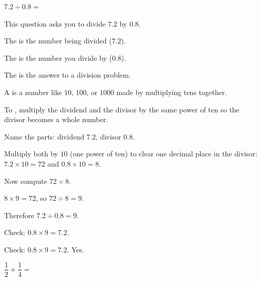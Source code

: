 
\noindent $7.2 \div 0.8 = $\ansblank{}


\noindent This question asks you to divide $7.2$ by $0.8$.

\begin{words}
  \item The is the number being divided ($7.2$).
  \item The is the number you divide by ($0.8$).
  \item The is the answer to a division problem.
  \item A is a number like $10$, $100$, or $1000$ made by
        multiplying tens together.
  \item To \unskip, multiply the dividend and the
        divisor by the same power of ten so the divisor becomes a whole number.
\end{words}

\begin{steps}
  \item Name the parts: dividend $7.2$, divisor $0.8$.
  \item Multiply both by $10$ (one power of ten) to clear one decimal place in
        the divisor: $7.2 \times 10 = 72$ and $0.8 \times 10 = 8$.
  \item Now compute $72 \div 8$.
  \item $8 \times 9 = 72$, so $72 \div 8 = 9$.
  \item Therefore $7.2 \div 0.8 = 9$.
  \item Check: $0.8 \times 9 = 7.2$.
\end{steps}


\noindent Check: $0.8 \times 9 = 7.2$. Yes.



\noindent $\dfrac{1}{2} + \dfrac{1}{4} = $\ansblank{}

